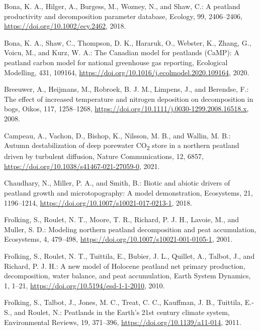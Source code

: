 \documentclass[
  12pt,
]{article}
\newlength{\cslhangindent}
\newlength{\cslentryspacingunit} %
\newenvironment{CSLReferences}[2] %
 {%
  \setlength{\parindent}{0pt}
  \ifodd #1
  \let\oldpar\par
  \def\par{\hangindent=\cslhangindent\oldpar}
  \fi
  \setlength{\parskip}{#2\cslentryspacingunit}
 }%
 {}
\begin{document}
\begin{CSLReferences}{0}{0}
\leavevmode{}%
Bona, K. A., Hilger, A., Burgess, M., Wozney, N., and Shaw, C.: A peatland productivity and decomposition parameter database, Ecology, 99, 2406--2406, \url{https://doi.org/10.1002/ecy.2462}, 2018.

\leavevmode{}%
Bona, K. A., Shaw, C., Thompson, D. K., Hararuk, O., Webster, K., Zhang, G., Voicu, M., and Kurz, W. A.: The {Canadian} model for peatlands ({CaMP}): {A} peatland carbon model for national greenhouse gas reporting, Ecological Modelling, 431, 109164, \url{https://doi.org/10.1016/j.ecolmodel.2020.109164}, 2020.

\leavevmode{}%
Breeuwer, A., Heijmans, M., Robroek, B. J. M., Limpens, J., and Berendse, F.: The effect of increased temperature and nitrogen deposition on decomposition in bogs, Oikos, 117, 1258--1268, \url{https://doi.org/10.1111/j.0030-1299.2008.16518.x}, 2008.

\leavevmode{}%
Campeau, A., Vachon, D., Bishop, K., Nilsson, M. B., and Wallin, M. B.: Autumn destabilization of deep porewater {CO}{\textsubscript{2}} store in a northern peatland driven by turbulent diffusion, Nature Communications, 12, 6857, \url{https://doi.org/10.1038/s41467-021-27059-0}, 2021.

\leavevmode{}%
Chaudhary, N., Miller, P. A., and Smith, B.: Biotic and abiotic drivers of peatland growth and microtopography: {A} model demonstration, Ecosystems, 21, 1196--1214, \url{https://doi.org/10.1007/s10021-017-0213-1}, 2018.

\leavevmode{}%
Frolking, S., Roulet, N. T., Moore, T. R., Richard, P. J. H., Lavoie, M., and Muller, S. D.: Modeling northern peatland decomposition and peat accumulation, Ecosystems, 4, 479--498, \url{https://doi.org/10.1007/s10021-001-0105-1}, 2001.

\leavevmode{}%
Frolking, S., Roulet, N. T., Tuittila, E., Bubier, J. L., Quillet, A., Talbot, J., and Richard, P. J. H.: A new model of {Holocene} peatland net primary production, decomposition, water balance, and peat accumulation, Earth System Dynamics, 1, 1--21, \url{https://doi.org/10.5194/esd-1-1-2010}, 2010.

\leavevmode{}%
Frolking, S., Talbot, J., Jones, M. C., Treat, C. C., Kauffman, J. B., Tuittila, E.-S., and Roulet, N.: Peatlands in the {Earth}'s 21st century climate system, Environmental Reviews, 19, 371--396, \url{https://doi.org/10.1139/a11-014}, 2011.


\end{CSLReferences}
\end{document}
